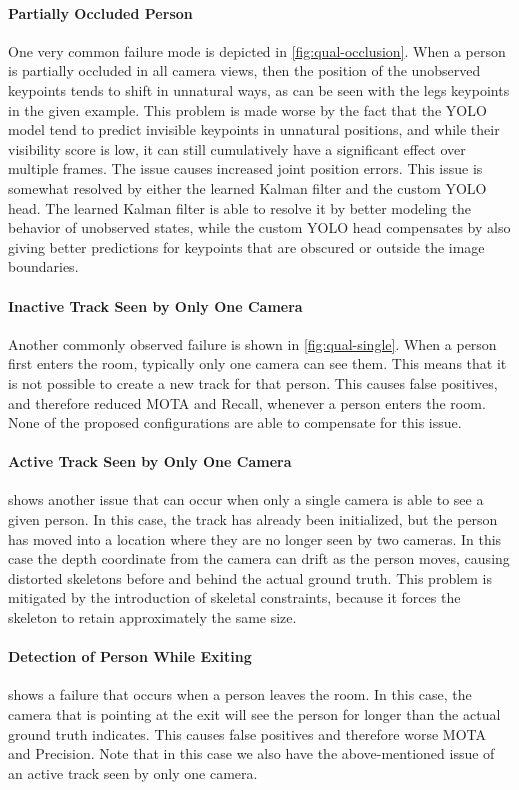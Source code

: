 \paragraph{Partially Occluded Person}
One very common failure mode is depicted in \cref{fig:qual-occlusion}. When a person is partially occluded in all camera views, then the position of the unobserved keypoints tends to shift in unnatural ways, as can be seen with the legs keypoints in the given example. This problem is made worse by the fact that the YOLO model tend to predict invisible keypoints in unnatural positions, and while their visibility score is low, it can still cumulatively have a significant effect over multiple frames. The issue causes increased joint position errors. This issue is somewhat resolved by either the learned Kalman filter and the custom YOLO head. The learned Kalman filter is able to resolve it by better modeling the behavior of unobserved states, while the custom YOLO head compensates by also giving better predictions for keypoints that are obscured or outside the image boundaries.

\paragraph{Inactive Track Seen by Only One Camera}
Another commonly observed failure is shown in \cref{fig:qual-single}. When a person first enters the room, typically only one camera can see them. This means that it is not possible to create a new track for that person. This causes false positives, and therefore reduced MOTA and Recall, whenever a person enters the room. None of the proposed configurations are able to compensate for this issue.

\paragraph{Active Track Seen by Only One Camera}
 shows another issue that can occur when only a single camera is able to see a given person. In this case, the track has already been initialized, but the person has moved into a location where they are no longer seen by two cameras. In this case the depth coordinate from the camera can drift as the person moves, causing distorted skeletons before and behind the actual ground truth. This problem is mitigated by the introduction of skeletal constraints, because it forces the skeleton to retain approximately the same size.

\paragraph{Detection of Person While Exiting}
 shows a failure that occurs when a person leaves the room. In this case, the camera that is pointing at the exit will see the person for longer than the actual ground truth indicates. This causes false positives and therefore worse MOTA and Precision. Note that in this case we also have the above-mentioned issue of an active track seen by only one camera.


